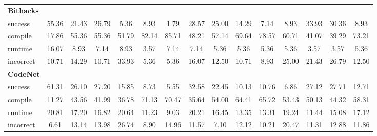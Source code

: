\begin{table}[t]
\begin{tabular}{@{}lcccccccccccccc@{}}
\textbf{Bithacks} & & & & & & & & & & & & & & \\ 
\quad success & 55.36 & 21.43 & 26.79 & 5.36 & 8.93 & 1.79 & 28.57 & 25.00 & 14.29 & 7.14 & 8.93 & 33.93 & 30.36 & 8.93 \\
\qquad compile & 17.86 & 55.36 & 55.36 & 51.79 & 82.14 & 85.71 & 48.21 & 57.14 & 69.64 & 78.57 & 60.71 & 41.07 & 39.29 & 73.21 \\
\qquad runtime & 16.07 & 8.93 & 7.14 & 8.93 & 3.57 & 7.14 & 7.14 & 5.36 & 5.36 & 5.36 & 5.36 & 3.57 & 3.57 & 5.36 \\
\qquad incorrect & 10.71 & 14.29 & 10.71 & 33.93 & 5.36 & 5.36 & 16.07 & 12.50 & 10.71 & 8.93 & 25.00 & 21.43 & 26.79 & 12.50 \\
 

\textbf{CodeNet} & & & & & & & & & & & & & & \\ 
\quad success & 61.31 & 26.10 & 27.20 & 15.85 & 8.73 & 5.55 & 32.58 & 22.45 & 10.13 & 10.76 & 6.86 & 27.12 & 27.71 & 12.71 \\
\qquad compile & 11.27 & 43.56 & 41.99 & 36.78 & 71.13 & 70.47 & 35.64 & 54.00 & 64.41 & 65.72 & 53.43 & 50.13 & 44.32 & 58.31 \\
\qquad runtime & 20.81 & 17.20 & 16.82 & 20.64 & 11.23 & 9.03 & 20.21 & 16.45 & 13.35 & 13.31 & 19.24 & 11.44 & 15.08 & 17.12 \\
\qquad incorrect & 6.61 & 13.14 & 13.98 & 26.74 & 8.90 & 14.96 & 11.57 & 7.10 & 12.12 & 10.21 & 20.47 & 11.31 & 12.88 & 11.86 \\
 

\bottomrule
\end{tabular}
\end{table}




